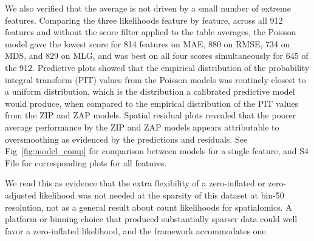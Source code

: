 \documentclass[10pt,letterpaper]{article}
\begin{document}
We also verified that the average is not driven by a small number of extreme features. Comparing the three likelihoods feature by feature, across all 912 features and without the score filter applied to the table averages, the Poisson model gave the lowest score for 814 features on MAE, 880 on RMSE, 734 on MDS, and 829 on MLG, and was best on all four scores simultaneously for 645 of the 912. Predictive plots showed that the empirical distribution of the probability integral transform (PIT) values from the Poisson models was routinely closest to a uniform distribution, which is the distribution a calibrated predictive model would produce, when compared to the empirical distribution of the PIT values from the ZIP and ZAP models. Spatial residual plots revealed that the poorer average performance by the ZIP and ZAP models appears attributable to oversmoothing as evidenced by the predictions and residuals. See Fig~\ref{fig:model_comp} for comparison between models for a single feature, and S4 File for corresponding plots for all features.

We read this as evidence that the extra flexibility of a zero-inflated or zero-adjusted likelihood was not needed at the sparsity of this dataset at bin-50 resolution, not as a general result about count likelihoods for spatialomics. A platform or binning choice that produced substantially sparser data could well favor a zero-inflated likelihood, and the framework accommodates one.
\end{document}

